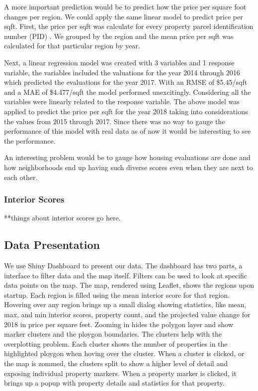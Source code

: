 \documentclass[12pt]{article}
\begin{document}
A more important prediction would be to predict how the price per square 
foot changes per region. We could apply the same linear model to predict 
price per sqft. First, the price per sqft was calculate for every
property parcel identification number (PID) \cite{Property49:online}. We
grouped by the region and the mean price per sqft was calculated for that
particular region by year.

Next, a linear regression model was created with 3 variables and 1 
response variable, the variables included the valuations for the year 
2014 through 2016 which predicted the evaluations for the year 2017. With 
an RMSE of \$5.45/sqft and a MAE of \$4.477/sqft the model performed 
unexcitingly. Considering all the variables were linearly related to the 
response variable. The above model was applied to predict the price per
sqft for the year 2018 taking into considerations the values from 2015
through 2017. Since there was no way to gauge the performance of this
model with real data as of now it would be interesting to see the
performance.

An interesting problem would be to gauge how housing evaluations are done 
and how neighborhoods end up having such diverse scores even when they
are next to each other.

\subsubsection{Interior Scores}

**things about interior scores go here.

\subsection{Data Presentation}

We use Shiny Dashboard \cite{ShinyDas50:online} to present our data. The 
dashboard has two parts, a interface to filter data and the map itself. 
Filters can be used to look at specific data points on the map. The map,
rendered using Leaflet, shows the regions upon startup. Each region is
filled using the mean interior score for that region. Hovering over any
region brings up a small dialog showing statistics, like mean, max, and
min interior scores, property count, and the projected value change for
2018 in price per square feet. Zooming in hides the polygon layer and
show marker clusters and the ploygon boundaries. The clusters help with
the overplotting problem. Each cluster shows the number of properties in
the highlighted ploygon when hoving over the cluster. When a cluster is
clicked, or the map is zommed, the clusters split to show a higher level
of detail and exposing individual property markers. When a property
marker is clicked, it brings up a popup with property details and
statistics for that property.
\end{document}
